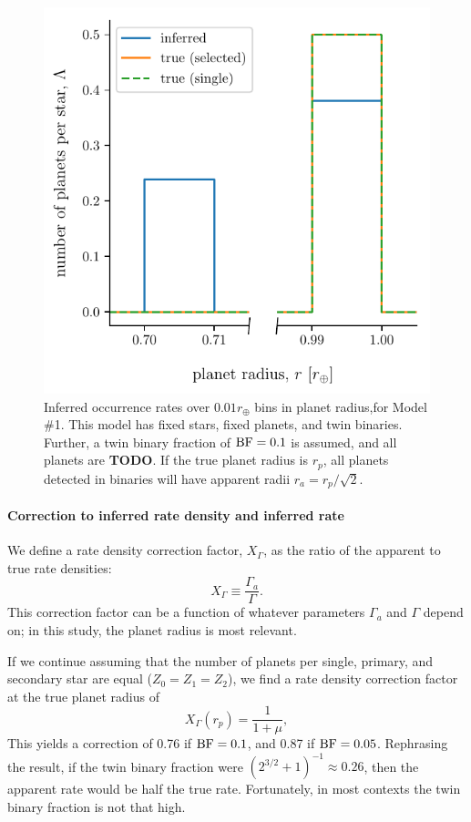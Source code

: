 \begin{figure}[!tb]
    \begin{center}
        \includegraphics[width=.6\textwidth]{figures/occ_rate_vs_radius_model_1_brokenx.pdf}
    \end{center}
    \vspace{-0.5cm}
    \caption{
        Inferred occurrence rates over $0.01r_\oplus$ bins in planet 
        radius,for Model \#1.
        This model has fixed stars, fixed planets, and twin binaries. 
        Further, a twin binary fraction of ${\rm BF}=0.1$ is assumed, and all 
        planets are {\bf TODO}.
        If the true planet radius is $r_p$, all planets detected in binaries 
        will have apparent radii $r_a = r_p/\sqrt{2}$.
    }
    \label{fig:errcases_model_1}
\end{figure}


\paragraph{Correction to inferred rate density and inferred rate}

We define a rate density correction factor, $X_\Gamma$, as the ratio of the 
apparent to true rate densities:
\begin{equation}
X_\Gamma \equiv \frac{\Gamma_a}{\Gamma}.
\end{equation}
This correction factor can be a function of whatever parameters $\Gamma_a$ and 
$\Gamma$ depend on; in this study, the planet radius is most relevant.

If we continue assuming that the number of planets per single, primary, and 
secondary star are equal ($Z_0=Z_1=Z_2$), we find a rate density correction 
factor at the true planet radius of
\begin{equation}
X_\Gamma(r_p) = \frac{1}{1+\mu},
\label{eq:Z_eq_model_1_correction}
\end{equation}
This yields a correction of 0.76 if ${\rm BF}=0.1$, and 0.87 if ${\rm 
BF}=0.05$.
Rephrasing the result, if the twin binary fraction were 
$(2^{3/2}+1)^{-1}\approx 0.26$, then the apparent rate would be half the true 
rate.
Fortunately, in most contexts the twin binary fraction is not that high.

